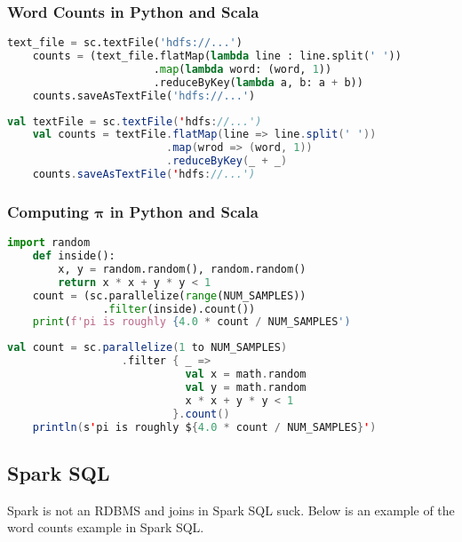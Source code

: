 \documentclass{report}
\begin{document}
\subsubsection{Word Counts in Python and Scala}
\begin{lstlisting}[language=Python, style=colorEX]
    text_file = sc.textFile('hdfs://...')
    counts = (text_file.flatMap(lambda line : line.split(' '))
                       .map(lambda word: (word, 1))
                       .reduceByKey(lambda a, b: a + b))
    counts.saveAsTextFile('hdfs://...')
\end{lstlisting}
\begin{lstlisting}[language=Scala, style=colorEX]
    val textFile = sc.textFile('hdfs://...')
    val counts = textFile.flatMap(line => line.split(' '))
                         .map(wrod => (word, 1))
                         .reduceByKey(_ + _)
    counts.saveAsTextFile('hdfs://...')
\end{lstlisting}

\subsubsection{Computing $\bm{\pi}$ in Python and Scala}
\begin{lstlisting}[language=Python, style=colorEX]
    import random
    def inside():
        x, y = random.random(), random.random()
        return x * x + y * y < 1
    count = (sc.parallelize(range(NUM_SAMPLES))
               .filter(inside).count())
    print(f'pi is roughly {4.0 * count / NUM_SAMPLES')
\end{lstlisting}
\begin{lstlisting}[language=Scala, style=colorEX]
    val count = sc.parallelize(1 to NUM_SAMPLES)
                  .filter { _ =>
                            val x = math.random
                            val y = math.random
                            x * x + y * y < 1
                          }.count()
    println(s'pi is roughly ${4.0 * count / NUM_SAMPLES}')
\end{lstlisting}

\subsection{Spark SQL}
Spark is not an RDBMS and joins in Spark SQL suck. Below is an example of the
word counts example in Spark SQL.
\end{document}
